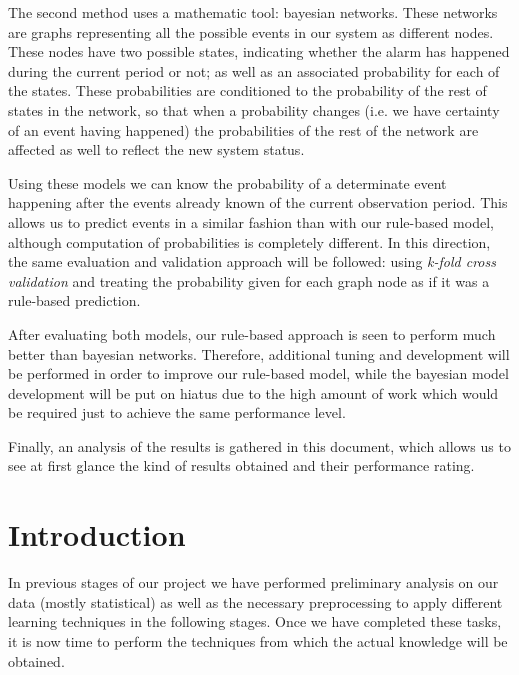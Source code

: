 \documentclass[a4paper,12pt]{article}
\begin{document}
The second method uses a mathematic tool: bayesian networks. These networks are graphs representing all the possible events in our system as different nodes. These nodes have two possible states, indicating whether the alarm has happened during the current period or not; as well as an associated probability for each of the states. These probabilities are conditioned to the probability of the rest of states in the network, so that when a probability changes (i.e. we have certainty of an event having happened) the probabilities of the rest of the network are affected as well to reflect the new system status.

Using these models we can know the probability of a determinate event happening after the events already known of the current observation period. This allows us to predict events in a similar fashion than with our rule-based model, although computation of probabilities is completely different. In this direction, the same evaluation and validation approach will be followed: using \emph{k-fold cross validation} and treating the probability given for each graph node as if it was a rule-based prediction.

After evaluating both models, our rule-based approach is seen to perform much better than bayesian networks. Therefore, additional tuning and development will be performed in order to improve our rule-based model, while the bayesian model development will be put on hiatus due to the high amount of work which would be required just to achieve the same performance level.

Finally, an analysis of the results is gathered in this document, which allows us to see at first glance the kind of results obtained and their performance rating.

\newpage
\tableofcontents %
\cleardoublepage
{} %
\listoffigures %

\cleardoublepage
{} %
\listoftables %
\cleardoublepage

\setcounter{page}{1}
\section{Introduction}
In previous stages of our project we have performed preliminary analysis on our data (mostly statistical) as well as the necessary preprocessing to apply different learning techniques in the following stages. Once we have completed these tasks, it is now time to perform the techniques from which the actual knowledge will be obtained.
\end{document}
